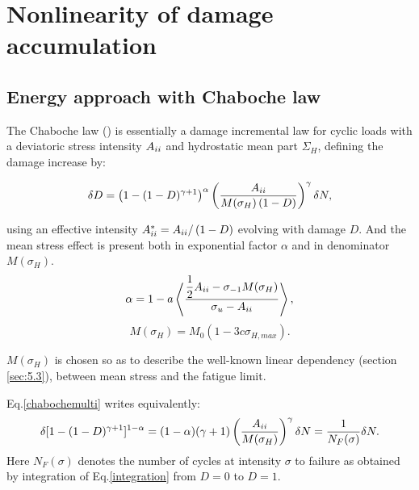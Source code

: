 \section{Nonlinearity of damage accumulation}
\label{sec:5.6}
\subsection{Energy approach with Chaboche law}
The Chaboche law (\cite{lemaitre1990mechanics}) is essentially a damage incremental law for cyclic loads with a deviatoric stress intensity ${A}_{\uppercase\expandafter{\romannumeral2}}$ and hydrostatic mean part $\Sigma_H$, defining the damage increase by:

\begin{equation}\delta D = \left( 1 -(1-D)^{\gamma+1}\right)^\alpha \left(\frac{{A}_{\uppercase\expandafter{\romannumeral2}} }{M(\sigma_H)\left( 1-D\right)}\right)^\gamma \delta N ,
\label{chabochemulti}
\end{equation} 

using an effective intensity ${A}_{\uppercase\expandafter{\romannumeral2}}^*={A}_{\uppercase\expandafter{\romannumeral2}}/\left( 1-D\right) $ evolving with damage $D$. And the mean stress effect is present both in exponential factor $\alpha$ and in denominator $M(\sigma_H)$.
$$\alpha=1 - a\left\langle \dfrac{\dfrac{1}{2}{A}_{\uppercase\expandafter{\romannumeral2}}-\sigma_{-1}M(\sigma_H) }{\sigma_{u} -{A}_{\uppercase\expandafter{\romannumeral2}}}\right\rangle,$$
$$M(\sigma_H) =M_0 \left(1-3c\sigma_{H,max}\right).$$

$M(\sigma_H)$ is chosen so as to describe the well-known linear dependency (section \ref{sec:5.3}), between mean stress and the fatigue limit.

Eq.\eqref{chabochemulti} writes equivalently:
\begin{equation}\delta [1-(1-D)^{\gamma+1}]^{1-\alpha}=(1-\alpha)(\gamma+1)\left(\dfrac{{A}_{\uppercase\expandafter{\romannumeral2}} }{M(\sigma_H)}\right)^\gamma \delta N=\dfrac{1}{N_F(\sigma)}\delta N.
\label{integration}
\end{equation}
Here $N_F(\sigma)$ denotes the number of cycles at intensity $\sigma$ to failure as obtained by integration of Eq.\eqref{integration} from $D=0$ to $D=1$. 

